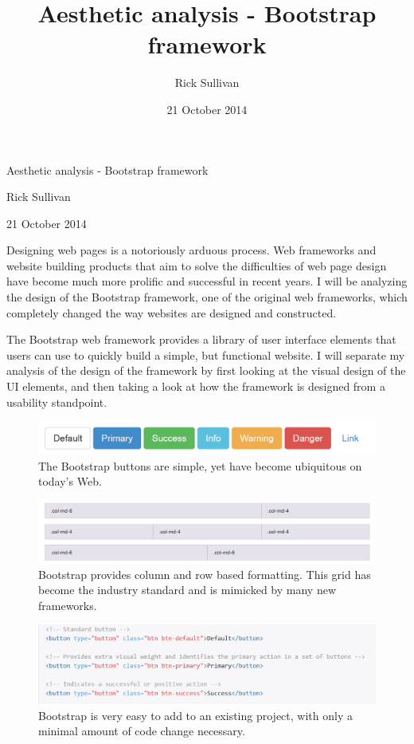 \documentclass[letterpaper, 12pt]{article}
\title{Aesthetic analysis - Bootstrap framework}
\author{Rick Sullivan}
\date{21 October 2014}
\newcommand{\myDate}{21 October 2014}
\begin{document}
\begin{center}
\large{Aesthetic analysis - Bootstrap framework}

\normalsize{Rick Sullivan}

\myDate    
\end{center}

\vspace{2 ex}


Designing web pages is a notoriously arduous process. Web frameworks and website building products that aim to solve the difficulties of web page design have become much more prolific and successful in recent years. I will be analyzing the design of the Bootstrap framework, one of the original web frameworks, which completely changed the way websites are designed and constructed.


The Bootstrap web framework provides a library of user interface elements that users can use to quickly build a simple, but functional website. I will separate my analysis of the design of the framework by first looking at the visual design of the UI elements, and then taking a look at how the framework is designed from a usability standpoint.

\begin{figure}[H]
\centering
\includegraphics{buttons.png}
\caption{The Bootstrap buttons are simple, yet have become ubiquitous on today's Web.}
\end{figure}

\begin{figure}[H]
\centering
\includegraphics[width=\textwidth]{grid.png}
\caption{Bootstrap provides column and row based formatting. This grid has become the industry standard and is mimicked by many new frameworks.}
\end{figure}

\begin{figure}[H]
\centering
\includegraphics{buttonCode.png}
\caption{Bootstrap is very easy to add to an existing project, with only a minimal amount of code change necessary.}
\end{figure}



\end{document}
